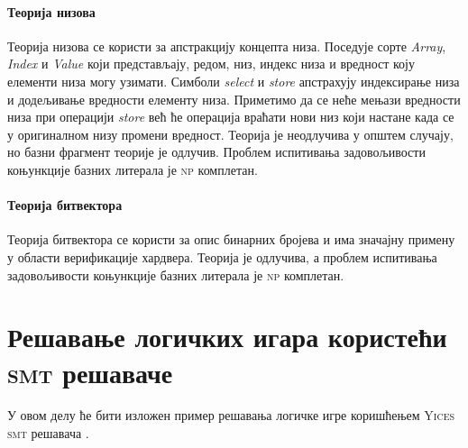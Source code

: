 \documentclass[a4paper]{article}
\begin{document}
\paragraph{Теорија низова} Теорија низова се користи за апстракцију концепта низа. Поседује сорте
\emph{Array}, \emph{Index} и \emph{Value} који представљају, редом, низ, индекс низа и вредност коју елементи
низа могу узимати. Симболи \emph{select} и \emph{store} апстрахују индексирање низа и додељивање вредности
елементу низа. Приметимо да се неће мењази вредности низа при операцији \emph{store} већ ће операција
враћати нови низ који настане када се у оригиналном низу промени вредност.
Теорија је неодлучива у општем случају, но базни фрагмент теорије је одлучив. Проблем испитивања
задовољивости коњункције базних литерала је \textsc{np} комплетан.

\paragraph{Теорија битвектора} Теорија битвектора се користи за опис бинарних бројева и има значајну примену
у области верификације хардвера. Теорија је одлучива, а проблем испитивања задовољивости коњункције базних
литерала је \textsc{np} комплетан.

\section{Решавање логичких игара користећи \textsc{smt} решаваче}
\label{sec:logicSmt}
У овом делу ће бити изложен пример решавања логичке игре коришћењем \textsc{Yices} \textsc{smt} решавача \cite{yices}.

\end{document}
